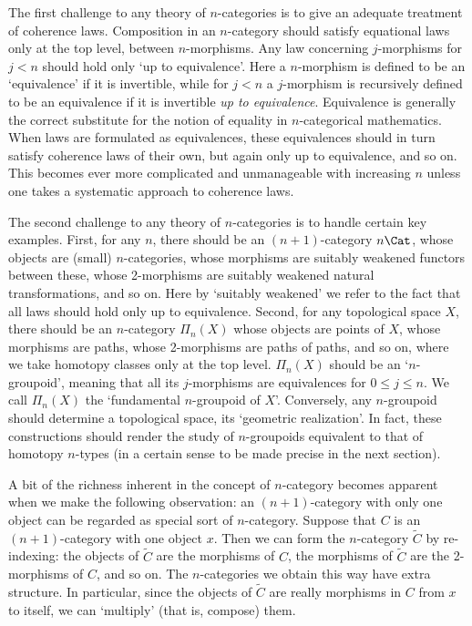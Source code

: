 The first challenge to any theory of $n$-categories is to give an
adequate treatment of coherence laws.  Composition in an $n$-category
should satisfy equational laws only at the top level, between
$n$-morphisms.   Any law concerning $j$-morphisms for $j < n$ should
hold only `up to equivalence'.   Here a $n$-morphism is defined to be an
`equivalence' if it is invertible, while for $j < n$ a $j$-morphism is
recursively defined to be an equivalence if it is invertible {\it up to
equivalence}.  Equivalence is generally the correct substitute for the
notion of equality in $n$-categorical mathematics.  When laws are
formulated as equivalences, these equivalences should in turn satisfy
coherence laws of their own, but again only up to equivalence, and so
on.  This becomes ever more complicated and unmanageable with increasing
$n$ unless one takes a systematic approach to coherence laws.  

The second challenge to any theory of $n$-categories is to handle
certain key examples.  First, for any $n$, there should be an
$(n+1)$-category $n\Cat$, whose objects are (small) $n$-categories, whose
morphisms are suitably weakened functors between these, whose
2-morphisms are suitably weakened natural transformations, and so on. 
Here by `suitably weakened' we refer to the fact that all laws should
hold only up to equivalence.  Second, for any topological space $X$,
there should be an $n$-category $\Pi_n(X)$ whose objects are points of
$X$, whose morphisms are paths, whose 2-morphisms are paths of paths,
and so on, where we take homotopy classes only at the top level. 
$\Pi_n(X)$ should be an `$n$-groupoid', meaning that all its
$j$-morphisms are equivalences for $0 \le j \le n$.  We call $\Pi_n(X)$
the `fundamental $n$-groupoid of $X$'.   Conversely, any $n$-groupoid
should determine a topological space, its `geometric realization'.  In
fact, these constructions should render the study of $n$-groupoids
equivalent to that of homotopy $n$-types (in a certain sense to be made
precise in the next section).  

A bit of the richness inherent in the concept of $n$-category becomes
apparent when we make the following observation: an $(n+1)$-category
with only one object can be regarded as special sort of $n$-category. 
Suppose that $C$ is an $(n+1)$-category with one object $x$.  Then we
can form the $n$-category $\tilde C$ by re-indexing: the objects of
$\tilde C$ are the morphisms of $C$, the morphisms of $\tilde C$ are the
2-morphisms of $C$, and so on.  The $n$-categories we obtain this way
have extra structure.  In particular, since the objects of $\tilde C$ are
really morphisms in $C$ from $x$ to itself, we can `multiply' (that is,
compose) them.

